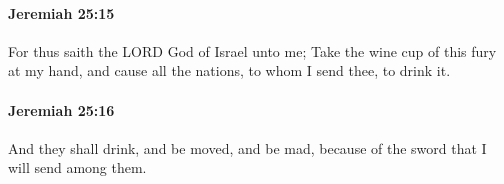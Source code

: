 		\paragraph{Jeremiah 25:15} %
			\label{JEREMIAH-25-15}

			For thus saith the LORD God of Israel unto me; Take the wine cup of this fury at my hand, and cause all the nations, to whom I send thee, to drink it.


		\paragraph{Jeremiah 25:16} %
			\label{JEREMIAH-25-16}

			And they shall drink, and be moved, and be mad, because of the sword that I will send among them.


